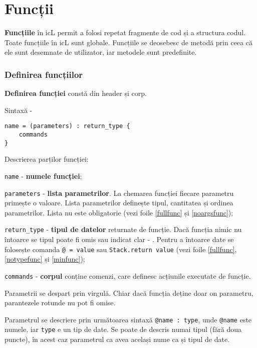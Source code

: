 \section{Funcții}

{\bf Funcțiile} în icL permit a folosi repetat fragmente de cod și a structura codul. Toate funcțiile în icL sunt globale. Funcțiile se deosebesc de metodă prin ceea că ele sunt desemnate de utilizator, iar metodele sunt predefinite.

\subsubsection{Definirea funcțiilor}

{\bf Definirea funcției} constă din header și corp.

\noindent Sintaxă -
\begin{verbatim}
name = (parameters) : return_type {
	commands
}
\end{verbatim}

Descrierea parților funcției:
\begin{icItems}
\item
	\texttt{name} - {\bf numele funcției};
\item
	\texttt{parameters} - {\bf lista parametrilor}. La chemarea funcției fiecare parametru primește o valoare. Lista parametrilor definește tipul, cantitatea și ordinea parametrilor. Lista nu este obligatorie (vezi foile \ref{fullfunc} și \ref{noargsfunc});
\item
	\texttt{return_type} - {\bf tipul de datelor} returnate de funcție. Dacă funcția nimic nu întoarce se tipul poate fi omis sau indicat clar - \void{}. Pentru a întoarce date se folosește comanda \texttt{@ = value} sau \texttt{Stack.return value} (vezi foile \ref{fullfunc}, \ref{notypefunc} și \ref{minfunc});
\item
	\texttt{commands} - {\bf corpul} conține comenzi, care definesc acțiunile executate de funcție.
\end{icItems}

Parametrii se despart prin virgulă. Chiar dacă funcția deține doar on parametru, parantezele rotunde nu pot fi omise.

Parametrul se descriere prin următoarea sintaxă \texttt{@name : type}, unde \texttt{@name} este numele, iar \texttt{type} e un tip de date. Se poate de descris numai tipul (fără doua puncte), în acest caz parametrul ca avea același nume ca și tipul de date.

